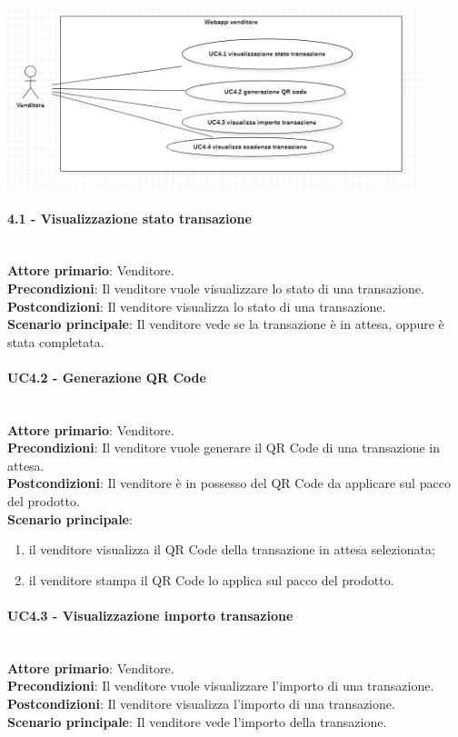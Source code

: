 \documentclass[a4paper, 12pt]{article}
\begin{document}
\includegraphics[width=0.9\textwidth]{UseCase_venditore4.png}

\paragraph{4.1 - Visualizzazione stato transazione}\\
\textbf{Attore primario}: Venditore.\\
\textbf{Precondizioni}: Il venditore vuole visualizzare lo stato di una transazione.\\
\textbf{Postcondizioni}: Il venditore visualizza lo stato di una transazione.\\
\textbf{Scenario principale}: Il venditore vede se la transazione è in attesa, oppure è stata completata.\\

\paragraph{UC4.2 - Generazione QR Code}\\
\textbf{Attore primario}: Venditore.\\
\textbf{Precondizioni}: Il venditore vuole generare il QR Code di una transazione in attesa.\\
\textbf{Postcondizioni}: Il venditore è in possesso del QR Code da applicare sul pacco del prodotto.\\
\textbf{Scenario principale}:
\begin{enumerate}
\item il venditore visualizza il QR Code della transazione in attesa selezionata;
\item il venditore stampa il QR Code lo applica sul pacco del prodotto.
\end{enumerate}

\paragraph{UC4.3 - Visualizzazione importo transazione}\\
\textbf{Attore primario}: Venditore.\\
\textbf{Precondizioni}: Il venditore vuole visualizzare l'importo di una transazione.\\
\textbf{Postcondizioni}: Il venditore visualizza l'importo di una transazione.\\
\textbf{Scenario principale}: Il venditore vede l'importo della transazione.\\
\end{document}
